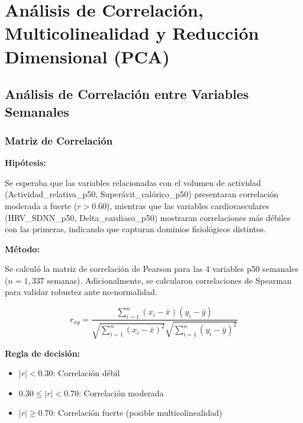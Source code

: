 \documentclass[12pt,letterpaper,twoside]{report}
\begin{document}
\chapter{Análisis de Correlación, Multicolinealidad y Reducción Dimensional (PCA)}

\section{Análisis de Correlación entre Variables Semanales}

\subsection{Matriz de Correlación}

\begin{hipotesisbox}
\textbf{Hipótesis:}

Se esperaba que las variables relacionadas con el volumen de actividad (Actividad\_relativa\_p50, Superávit\_calórico\_p50) presentaran correlación moderada a fuerte ($r > 0.60$), mientras que las variables cardiovasculares (HRV\_SDNN\_p50, Delta\_cardiaco\_p50) mostraran correlaciones más débiles con las primeras, indicando que capturan dominios fisiológicos distintos.
\end{hipotesisbox}

\begin{estadisticobox}
\textbf{Método:}

Se calculó la matriz de correlación de Pearson para las 4 variables p50 semanales ($n=1,337$ semanas). Adicionalmente, se calcularon correlaciones de Spearman para validar robustez ante no-normalidad.

\begin{equation}
r_{xy} = \frac{\sum_{i=1}^{n}(x_i - \bar{x})(y_i - \bar{y})}{\sqrt{\sum_{i=1}^{n}(x_i - \bar{x})^2}\sqrt{\sum_{i=1}^{n}(y_i - \bar{y})^2}}
\end{equation}
\end{estadisticobox}

\begin{reglabox}
\textbf{Regla de decisión:}

\begin{itemize}[noitemsep]
    \item $|r| < 0.30$: Correlación débil
    \item $0.30 \leq |r| < 0.70$: Correlación moderada
    \item $|r| \geq 0.70$: Correlación fuerte (posible multicolinealidad)
\end{itemize}
\end{reglabox}
\end{document}
